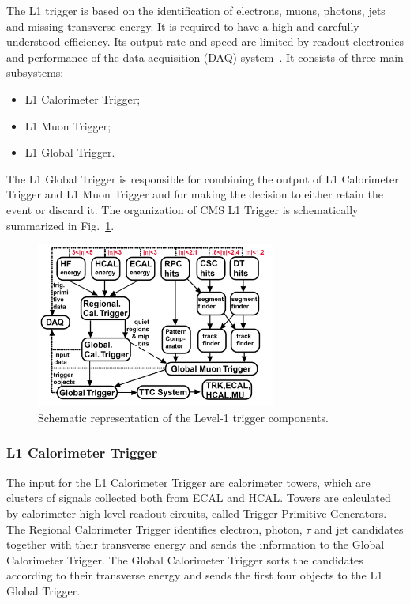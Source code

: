 The L1 trigger is based on the identification of electrons, muons, photons, jets and missing transverse energy. It is required to have a high and carefully understood efficiency. Its output rate and speed are limited by readout electronics and performance of the data
acquisition (DAQ) system~\cite{Cittolin:578006}. It consists of three main subsystems:
\begin{itemize}
\item L1 Calorimeter Trigger;
\item L1 Muon Trigger;
\item L1 Global Trigger.
\end{itemize}
The L1 Global Trigger is responsible for combining the output of L1 Calorimeter
Trigger and L1 Muon Trigger and for making the decision to either retain the event or discard it. The organization of CMS L1 Trigger is schematically summarized in Fig.~\ref{fig:trigL1}.
\begin{figure}[htb]
\centering
\includegraphics[width=0.7\textwidth]{images/trigL1.png}
\caption{Schematic representation of the Level-1 trigger components.}\label{fig:trigL1}
\end{figure}

\subsubsection{L1 Calorimeter Trigger}

The input for the L1 Calorimeter Trigger are calorimeter towers, which are clusters of signals collected both from ECAL and HCAL. Towers are calculated by calorimeter high level readout circuits, called Trigger Primitive Generators. The Regional Calorimeter Trigger identifies electron, photon, $\tau$ and jet candidates together with their transverse energy and sends the information to the Global Calorimeter Trigger. The Global Calorimeter Trigger sorts the candidates according to their transverse energy and sends the first four objects to the L1 Global Trigger.

